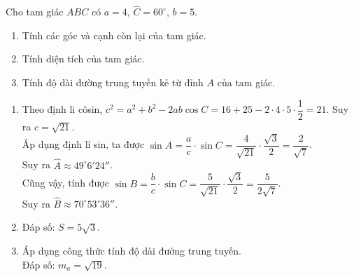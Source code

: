 \begin{bt}%
	Cho tam giác $ABC$ có $a=4$, $\widehat{C}=60^\circ$, $b=5$.
	\begin{enumerate}
		\item Tính các góc và cạnh còn lại của tam giác.
		\item Tính diện tích của tam giác.
		\item Tính độ dài đường trung tuyến kẻ từ đỉnh $A$ của tam giác.
	\end{enumerate}
	\loigiai
	{
	\begin{enumerate}
		\item Theo định li côsin, $c^2=a^2+b^2-2a b\cos C=16+25-2\cdot 4\cdot 5\cdot\dfrac{1}{2}=21$. Suy ra $c=\sqrt{21}$.\\
		Áp dụng định lí sin, ta được $\sin A=\dfrac{a}{c}\cdot\sin C=\dfrac{4}{\sqrt{21}}\cdot\dfrac{\sqrt{3}}{2}=\dfrac{2}{\sqrt{7}}$.\\
		Suy ra $\widehat{A}\approx 49^\circ6'24''$.\\
		Cũng vậy, tính được $\sin B=\dfrac{b}{c}\cdot\sin C=\dfrac{5}{\sqrt{21}}\cdot\dfrac{\sqrt{3}}{2}=\dfrac{5}{2\sqrt{7}}$.\\
		Suy ra $\widehat{B}\approx 70^\circ53'36''$.
		\item Đáp số: $S=5\sqrt{3}$.
		\item Áp dụng công thức tính độ dài đường trung tuyến.\\
		Đáp số: $m_a=\sqrt{19}$.
	\end{enumerate}
	}
\end{bt}

